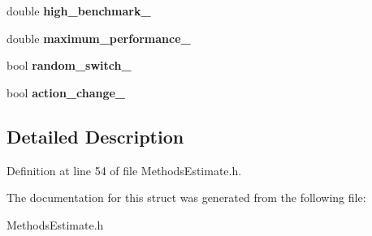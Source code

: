 \begin{DoxyCompactItemize}
\item 
\hypertarget{structStruct__Estimate_aa876453ecd5a4e13ab9bf772ea4daac5}{double {\bfseries high\-\_\-benchmark\-\_\-}}\label{structStruct__Estimate_aa876453ecd5a4e13ab9bf772ea4daac5}

\item 
\hypertarget{structStruct__Estimate_a9fba7f1bb54a7b5a3f1683f2a567e3d7}{double {\bfseries maximum\-\_\-performance\-\_\-}}\label{structStruct__Estimate_a9fba7f1bb54a7b5a3f1683f2a567e3d7}

\item 
\hypertarget{structStruct__Estimate_aa1470fc0ef35f78f59abd0cc51916711}{bool {\bfseries random\-\_\-switch\-\_\-}}\label{structStruct__Estimate_aa1470fc0ef35f78f59abd0cc51916711}

\item 
\hypertarget{structStruct__Estimate_ac267b3a432bde596b9bf3548c7ac65df}{bool {\bfseries action\-\_\-change\-\_\-}}\label{structStruct__Estimate_ac267b3a432bde596b9bf3548c7ac65df}

\end{DoxyCompactItemize}


\subsection{Detailed Description}


Definition at line 54 of file Methods\-Estimate.\-h.



The documentation for this struct was generated from the following file\-:\begin{DoxyCompactItemize}
\item 
Methods\-Estimate.\-h\end{DoxyCompactItemize}
